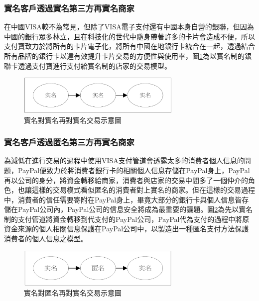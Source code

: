 		\subsubsection{實名客戶透過實名第三方再實名商家}
		在中國VISA較不為常見，但除了VISA電子支付還有中國本身自營的銀聯，但因為中國的銀行眾多林立，且在科技化的世代中隨身帶著許多的卡片會造成不便，所以支付寶致力於將所有的卡片電子化，將所有中國在地銀行卡統合在一起，透過結合所有品牌的銀行卡以達有效提升卡片交易的方便性與使用率，圖\ref{modennn}為以實名制的銀聯卡透過支付寶進行支付給實名制的店家的交易模型。

		\begin{figure}[htbp]
			\centering
			\includegraphics[width = 0.7\textwidth]{modennn.png}
			\caption{實名對實名再對實名交易示意圖}\label{modennn}
		\end{figure}

		\subsubsection{實名客戶透過匿名第三方再實名商家}
		為減低在進行交易的過程中使用VISA支付管道會透露太多的消費者個人信息的問題，PayPal便致力於將消費者銀行卡的相關個人信息存儲在PayPal身上，PayPal再以公司的身分，將資金轉移給商家，消費者與店家的交易中間多了一個仲介的角色，也讓這樣的交易模式看似匿名的消費者對上實名的商家。但在這樣的交易過程中，消費者的信任需要寄附在PayPal身上，畢竟大部分的銀行卡與個人信息皆存儲在PayPal公司內，PayPal公司的信息安全將成為最重要的議題。圖\ref{modenan}為先以實名制的支付管道將資金轉移到代支付的PayPal公司，PayPal代為支付的過程中將原資金來源的個人相關信息保護在PayPal公司中，以製造出一種匿名支付方法保護消費者的個人信息之模型。

		\begin{figure}[htbp]
			\centering
			\includegraphics[width = 0.7\textwidth]{modenan.png}
			\caption{實名對匿名再對實名交易示意圖}\label{modenan}
		\end{figure}

